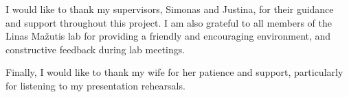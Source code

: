 I would like to thank my supervisors, Simonas and Justina, for their guidance and support throughout this project.
I am also grateful to all members of the Linas Mažutis lab for providing a friendly and encouraging environment,
and constructive feedback during lab meetings.

Finally, I would like to thank my wife for her patience and support, particularly for listening to my presentation rehearsals.
